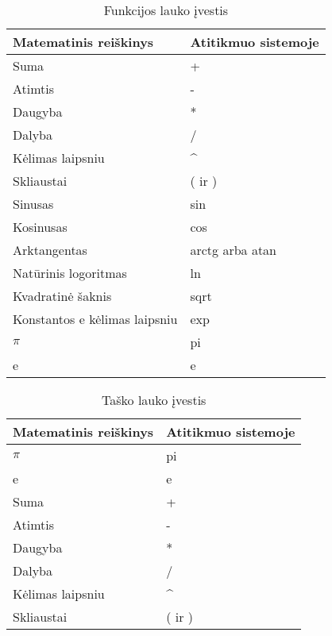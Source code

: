 	\begin{table} [H]
		\renewcommand{\tabularxcolumn}[1]{m{#1}}
		\centering
		\caption{Funkcijos lauko įvestis}
		\label{tab:funcInput}
		\begin{tabular} {| l | l |}
			\hline
			Matematinis reiškinys					& Atitikmuo sistemoje 			\\
			\hline		
			Suma 									& +								\\
			\hline					
			Atimtis 								& -								\\
			\hline
			Daugyba									& *								\\
			\hline
			Dalyba 									& 	/							\\
			\hline
			Kėlimas laipsniu 						& \string^							\\
			\hline
			Skliaustai 								& ( ir )						\\
			\hline	
			Sinusas 								& sin  							\\
			\hline	
			Kosinusas								& cos 							\\
			\hline
			Arktangentas							& arctg arba atan				\\
			\hline
			Natūrinis logoritmas					& ln 							\\
			\hline
			Kvadratinė šaknis						& sqrt 							\\
			\hline
			Konstantos e kėlimas laipsniu			& exp 							\\
			\hline
			$\pi$									& pi							\\
			\hline	
			e 										& e								\\
			\hline
		\end{tabular}
	\end{table}
	
	
	\begin{table} [H]
		\renewcommand{\tabularxcolumn}[1]{m{#1}}
		\centering
		\caption{Taško lauko įvestis}
		\label{tab:pointInput}
		\begin{tabular} {| l | l |}
			\hline
			Matematinis reiškinys					& Atitikmuo sistemoje 			\\
			\hline		
			$\pi$									& pi							\\
			\hline	
			e 										& e								\\
			\hline	
			Suma 									& +								\\
			\hline					
			Atimtis 								& -								\\
			\hline
			Daugyba									& *								\\
			\hline
			Dalyba 									& 	/							\\
			\hline
			Kėlimas laipsniu 						& \string^	 							\\
			\hline
			Skliaustai 								& ( ir )						\\
			\hline
		\end{tabular}
	\end{table}
	
	
	